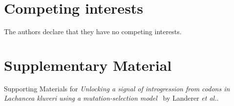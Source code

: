 \documentclass[doublespacing,linenumbers]{bmcart-modified}
\newcommand\suppl{\par
  \setcounter{section}{0}%
  \setcounter{subsection}{0}%
  \setcounter{table}{0}%
  \setcounter{figure}{0}%
  \setcounter{equation}{0}%
  \gdef\thesection{\Alph{section}.1}%
  \def\thefigure{\Alph{section}\arabic{figure}}%
  \def\thetable{\Alph{section}\arabic{table}}%
  \def\theequation {\Alph{section}\arabic{equation}}}
\begin{document}
\begin{backmatter}
\section*{Competing interests}
The authors declare that they have no competing interests.



 
%



\pagebreak



\suppl

\setcounter{section}{19} %
\setcounter{page}{1}
\renewcommand{\thepage}{S\arabic{page}} %

\section*{Supplementary Material}

Supporting Materials for \emph{Unlocking a signal of introgression from codons in Lachancea kluveri using a mutation-selection model} \ by Landerer \emph{et al.}.


\end{backmatter}
\end{document}
